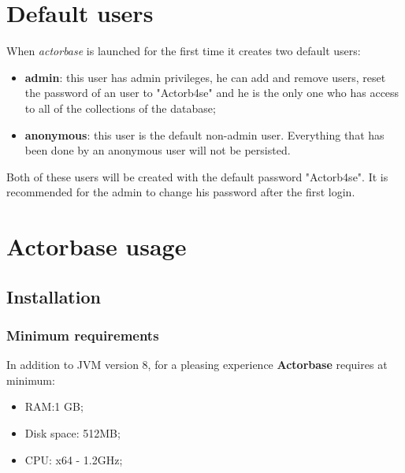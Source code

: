 \documentclass{scalatekids-article}
\begin{document}
\section{Default users}

When \textit{actorbase} is launched for the first time it creates two default users:
\begin{itemize}
\item \textbf{admin}: this user has admin privileges, he can add and remove users, reset the password of an user to "Actorb4se" and he is the only one who has access to all of the collections of the database;
\item \textbf{anonymous}: this user is the default non-admin user. Everything that has been done by an anonymous user will not be persisted.
\end{itemize}
Both of these users will be created with the default password "Actorb4se". It is recommended for the admin to change his password after the first login.





\section{Actorbase usage}

\subsection{Installation}

\subsubsection{Minimum requirements}

In addition to JVM version 8, for a pleasing experience \textbf{Actorbase} requires at minimum:
\begin{itemize}
\item RAM:\@1 GB;\@
\item Disk space: 512MB;\@
\item CPU: x64 - 1.2GHz;
\end{itemize}
\end{document}
